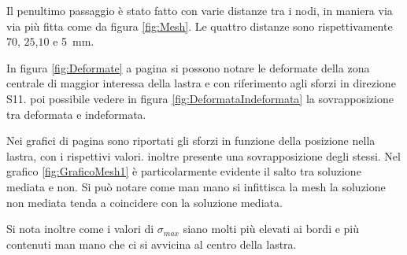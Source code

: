 Il penultimo passaggio è stato fatto con varie distanze tra i nodi, in maniera via via più fitta come da figura \ref{fig:Mesh}. Le quattro distanze sono rispettivamente $70$, $25$,$10$ e \SI{5}{\milli\metre}.

In figura \ref{fig:Deformate} a pagina \pageref{fig:Deformate} si possono notare le deformate della zona centrale di maggior interessa della lastra e con riferimento agli sforzi in direzione S11. 
\e poi possibile vedere in figura \ref{fig:DeformataIndeformata} la sovrapposizione tra deformata e indeformata.

Nei grafici di pagina \pageref{fig:GraficoMesh1} sono riportati gli sforzi in funzione della posizione nella lastra, con i rispettivi valori. 
\e inoltre presente una sovrapposizione degli stessi.
Nel grafico \ref{fig:GraficoMesh1} è particolarmente evidente il salto tra soluzione mediata e non. 
Si può notare come man mano si infittisca la mesh la soluzione non mediata tenda a coincidere con la soluzione mediata.

Si nota inoltre come i valori di $\sigma _{max}$ siano molti più elevati ai bordi e più contenuti man mano che ci si avvicina al centro della lastra. 


